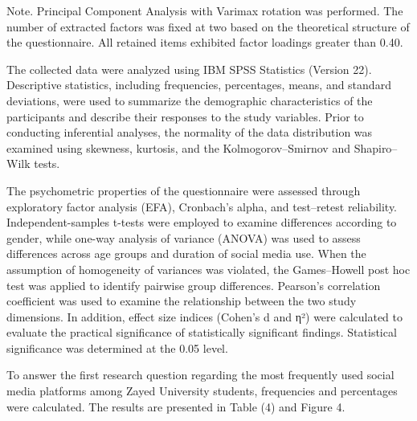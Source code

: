\documentclass[10pt]{NSP1}
\begin{document}
Note. Principal Component Analysis with Varimax rotation was performed. The number of extracted factors was fixed at two based on the theoretical structure of the questionnaire. All retained items exhibited factor loadings greater than 0.40.

\par\vspace{5.0pt}\vspace{5.0pt}

The collected data were analyzed using IBM SPSS Statistics (Version 22). Descriptive statistics, including frequencies, percentages, means, and standard deviations, were used to summarize the demographic characteristics of the participants and describe their responses to the study variables. Prior to conducting inferential analyses, the normality of the data distribution was examined using skewness, kurtosis, and the Kolmogorov–Smirnov and Shapiro–Wilk tests.

The psychometric properties of the questionnaire were assessed through exploratory factor analysis (EFA), Cronbach's alpha, and test–retest reliability. Independent-samples t-tests were employed to examine differences according to gender, while one-way analysis of variance (ANOVA) was used to assess differences across age groups and duration of social media use. When the assumption of homogeneity of variances was violated, the Games–Howell post hoc test was applied to identify pairwise group differences. Pearson's correlation coefficient was used to examine the relationship between the two study dimensions. In addition, effect size indices (Cohen's d and η²) were calculated to evaluate the practical significance of statistically significant findings. Statistical significance was determined at the 0.05 level.

\par\vspace{5.0pt}\vspace{5.0pt}

\par\vspace{5.0pt}\vspace{5.0pt}

To answer the first research question regarding the most frequently used social media platforms among Zayed University students, frequencies and percentages were calculated. The results are presented in Table (4) and Figure 4.
\end{document}
